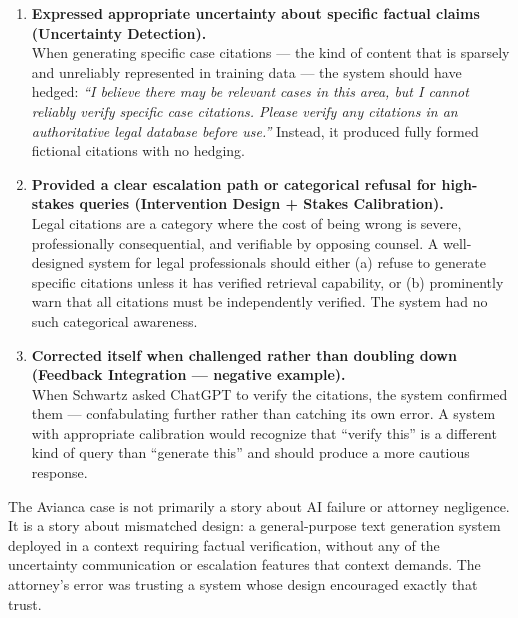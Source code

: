 \begin{enumerate}
    \item \textbf{Expressed appropriate uncertainty about specific factual claims (Uncertainty Detection).}\\
    When generating specific case citations --- the kind of content that is sparsely and unreliably represented in training data --- the system should have hedged: \emph{``I believe there may be relevant cases in this area, but I cannot reliably verify specific case citations. Please verify any citations in an authoritative legal database before use.''} Instead, it produced fully formed fictional citations with no hedging.

    \item \textbf{Provided a clear escalation path or categorical refusal for high-stakes queries (Intervention Design + Stakes Calibration).}\\
    Legal citations are a category where the cost of being wrong is severe, professionally consequential, and verifiable by opposing counsel. A well-designed system for legal professionals should either (a) refuse to generate specific citations unless it has verified retrieval capability, or (b) prominently warn that all citations must be independently verified. The system had no such categorical awareness.

    \item \textbf{Corrected itself when challenged rather than doubling down (Feedback Integration --- negative example).}\\
    When Schwartz asked ChatGPT to verify the citations, the system confirmed them --- confabulating further rather than catching its own error. A system with appropriate calibration would recognize that ``verify this'' is a different kind of query than ``generate this'' and should produce a more cautious response.
\end{enumerate}

\begin{keyconcept}
The Avianca case is not primarily a story about AI failure or attorney negligence. It is a story about mismatched design: a general-purpose text generation system deployed in a context requiring factual verification, without any of the uncertainty communication or escalation features that context demands. The attorney's error was trusting a system whose design encouraged exactly that trust.
\end{keyconcept}


